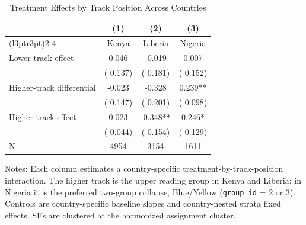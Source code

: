 \begin{table}[!htbp]
\centering
\caption{Treatment Effects by Track Position Across Countries}
\label{tab:pooled_upper_lower}
\begin{threeparttable}
\begin{tabular}[t]{lccc}
\toprule
 & (1) & (2) & (3) \\
\cmidrule(l{3pt}r{3pt}){2-4}
 & Kenya & Liberia & Nigeria \\
\midrule
Lower-track effect &   0.046 &  -0.019 &   0.007 \\
 & (  0.137) & (  0.181) & (  0.152) \\
\addlinespace
Higher-track differential &  -0.023 &  -0.328 &   0.239** \\
 & (  0.147) & (  0.201) & (  0.098) \\
\addlinespace
Higher-track effect &   0.023 &  -0.348** &   0.246* \\
 & (  0.044) & (  0.154) & (  0.129) \\
\addlinespace
N & 4954 & 3154 & 1611 \\
\bottomrule
\end{tabular}
\begin{tablenotes}[para]
\item Notes: Each column estimates a country-specific treatment-by-track-position interaction. The higher track is the upper reading group in Kenya and Liberia; in Nigeria it is the preferred two-group collapse, Blue/Yellow (\texttt{group\_id} = 2 or 3).
Controls are country-specific baseline slopes and country-nested strata fixed effects. SEs are clustered at the harmonized assignment cluster.
\end{tablenotes}
\end{threeparttable}
\end{table}
